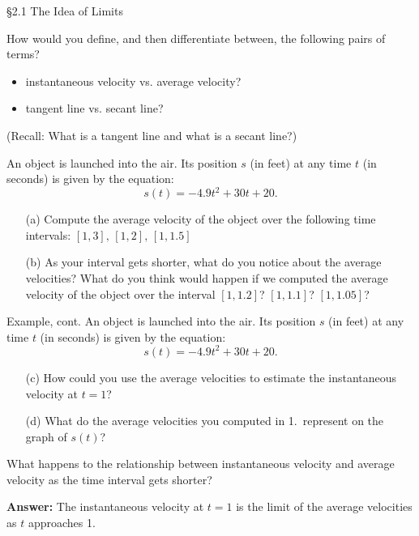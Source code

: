 \documentclass[cal1spr16Lectures.tex]{subfiles}
\begin{document}
\begin{frame}{\S 2.1 The Idea of Limits}
\begin{que} How would you define, and then differentiate between, the following pairs of terms? 
\begin{itemize}
\item instantaneous velocity vs. average velocity?
\item tangent line vs. secant line? 
\end{itemize}
\end{que}

(Recall: What is a tangent line and what is a secant line?)
\end{frame}

\begin{frame}\footnotesize
\begin{ex} An object is launched into the air. Its position $s$ (in feet) at any time $t$ (in seconds) is given by the equation:
\[s(t)=-4.9t^2+30t+20.\]
\hrulefill
\begin{itemize}
\item[(a)] Compute the average velocity of the object over the following time intervals:  $[1,3],\,[1,2],\,[1,1.5]$
\item[(b)] As your interval gets shorter, what do you notice about the average velocities?  What do you think would happen if we computed the average velocity of the object over the interval $[1,1.2]$? $[1,1.1]$? $[1,1.05]$?
\end{itemize}
\end{ex}
\end{frame}

\begin{frame}\footnotesize
\begin{block}{Example, cont.} An object is launched into the air. Its position $s$ (in feet) at any time $t$ (in seconds) is given by the equation:
\[s(t)=-4.9t^2+30t+20.\]
\hrulefill
\begin{itemize}
\item[(c)] How could you use the average velocities to estimate the instantaneous velocity at $t=1$?
\item[(d)] What do the average velocities you computed in 1.\ represent on the graph of $s(t)$?
\end{itemize}
\end{block}
\end{frame}

\begin{frame}
\begin{que} What happens to the relationship between \alert{instantaneous} velocity and \alert{average} velocity as the time interval gets shorter? \end{que}

{\bf Answer:} The instantaneous velocity at $t=1$ is the limit of the average velocities as $t$ approaches 1.
\end{frame}
\end{document}
